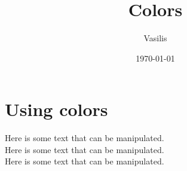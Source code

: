 \documentclass{article}
\title{Colors}
\author{Vasilis}
\date{\today}
\begin{document}
\maketitle

\section{\color{red} Using colors}

Here is {\color{OliveGreen} some} text that can be manipulated. \\
\textcolor{mynewcolor}{Here} is some text that can be manipulated. \\
\textcolor{nextcolor}{Here} is some text that can be manipulated.
\end{document}
